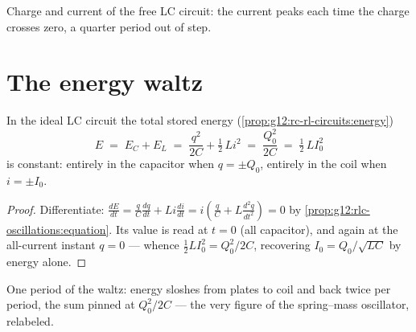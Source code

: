 \begin{omfigure}

{\small Charge and current of the free LC circuit: the current peaks
each time the charge crosses zero, a quarter period out of step.}
\end{omfigure}

\section{The energy waltz}

\begin{proposition}\label{prop:g12:rlc-oscillations:energy}
In the ideal LC circuit the total stored energy
(\cref{prop:g12:rc-rl-circuits:energy})
\[
E \;=\; E_C + E_L \;=\; \frac{q^2}{2C} + \tfrac12\,L i^2
\;=\; \frac{Q_0^2}{2C} \;=\; \tfrac12\,L I_0^2
\]
is constant: entirely in the capacitor when $q = \pm Q_0$, entirely in
the coil when $i = \pm I_0$.
\end{proposition}

\begin{proof}
Differentiate: $\frac{dE}{dt} = \frac{q}{C}\frac{dq}{dt} +
Li\frac{di}{dt} = i\left(\frac{q}{C} + L\frac{d^2q}{dt^2}\right) = 0$
by \cref{prop:g12:rlc-oscillations:equation}. Its value is read at
$t = 0$ (all capacitor), and again at the all-current instant
$q = 0$ --- whence $\tfrac12 L I_0^2 = Q_0^2/2C$, recovering
$I_0 = Q_0/\sqrt{LC}$ by energy alone.
\end{proof}

\begin{omfigure}

{\small One period of the waltz: energy sloshes from plates to coil
and back twice per period, the sum pinned at $Q_0^2/2C$ --- the very
figure of the spring--mass oscillator, relabeled.}
\end{omfigure}

